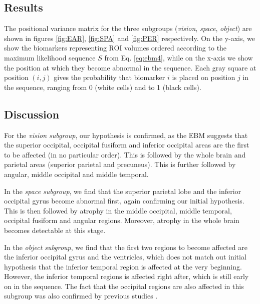 \subsection{Results}


The positional variance matrix for the three subgroups (\emph{vision}, \emph{space}, \emph{object}) are shown in figures \ref{fig:EAR}, \ref{fig:SPA} and \ref{fig:PER} respectively. On the y-axis, we show the biomarkers representing ROI volumes ordered according to the maximum likelihood sequence $S$ from Eq. \ref{eq:ebm4}, while on the x-axis we show the position at which they become abnormal in the sequence. Each gray square at position $(i,j)$ gives the probability that biomarker $i$ is placed on position $j$ in the sequence, ranging from 0 (white cells) and to 1 (black cells).

\subsection{Discussion}

For the \emph{vision subgroup}, our hypothesis is confirmed, as the EBM suggests that the superior occipital, occipital fusiform and inferior occipital areas are the first to be affected (in no particular order). This is followed by the whole brain and parietal areas (superior parietal and precuneus). This is further followed by angular, middle occipital and middle temporal. 

In the \emph{space subgroup}, we find that the superior parietal lobe and the inferior occipital gyrus become abnormal first, again confirming our initial hypothesis. This is then followed by atrophy in the middle occipital, middle temporal, occipital fusiform and angular regions. Moreover, atrophy in the whole brain becomes detectable at this stage. 

In the \emph{object subgroup}, we find that the first two regions to become affected are the inferior occipital gyrus and the ventricles, which does not match out initial hypothesis that the inferior temporal region is affected at the very beginning. However, the inferior temporal regions is affected right after, which is still early on in the sequence. The fact that the occipital regions are also affected in this subgroup was also confirmed by previous studies \cite{ross1996progressive,kiyosawa1989alzheimer}. 


